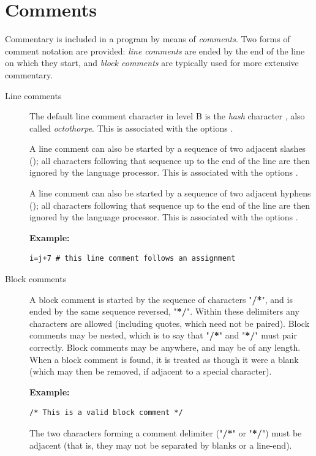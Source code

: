 \section{Comments}\label{refcomment}
\index{,}
\index{,}
\index{,}
 Commentary is included in a \crexx{} program by means of
\emph{comments}.  Two forms of comment notation are provided:
\emph{line comments} are ended by the end of the line on which they
start, and \emph{block comments} are typically used for more extensive
commentary.
\begin{description}
\item[Line comments]\label{reflineco}
The default line comment character in \crexx{} level B is the
\emph{hash} character \code{\#}, also called \emph{octothorpe}. This is
associated with the options .

A line comment can also be started by a sequence of two adjacent slashes
(\code{//}); all characters following that sequence up to the
end of the line are then ignored by the \crexx{} language processor.
This is associated with the options .

A line comment can also be started by a sequence of two adjacent hyphens
(\doublehyphen{}); all characters following that sequence up to the
end of the line are then ignored by the \crexx{} language processor.
This is associated with the options .

\textbf{Example:}
\begin{lstlisting}
i=j+7 # this line comment follows an assignment
\end{lstlisting}
\item[Block comments]\label{refblockco}
 A block comment is started by the sequence of characters
"\textbf{/*}", and is ended by the same sequence reversed,
"\textbf{*/}".
Within these delimiters any characters are allowed (including quotes,
which need not be paired).
Block comments may be nested, which is to say that
"\textbf{/*}" and "\textbf{*/}" must pair correctly.
Block comments may be anywhere, and may be of any length.
When a block comment is found, it is treated as though it were a blank
(which may then be removed, if adjacent to a special character).
 
\textbf{Example:}
\begin{lstlisting}
/* This is a valid block comment */
\end{lstlisting}
The two characters forming a comment delimiter
("\textbf{/*}" or "\textbf{*/}") must be adjacent
(that is, they may not be separated by blanks or a line-end).
\end{description}
